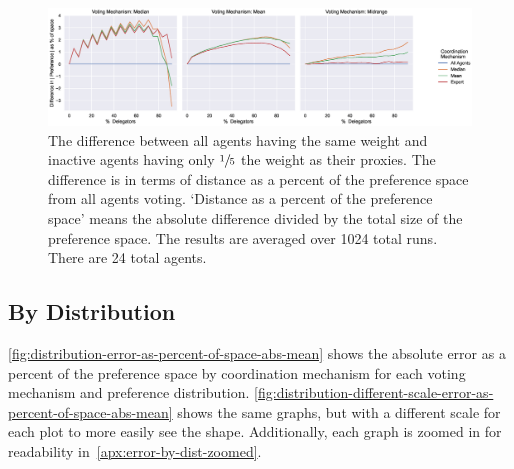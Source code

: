 \begin{landscape}
    \begin{figure}[p]
        \centering
        \includegraphics[scale=0.55]
        {content/chapter2/figures/different_weight/difference_abs_pref_percent_of_space}
        \caption{
            The difference between all agents having the same weight and inactive
            agents having only $\sfrac{1}{5}$ the weight as their proxies.
            The difference is in terms of distance as a percent of the preference
            space from all agents voting.
            `Distance as a percent of the preference space' means the absolute
            difference divided by the total size of the preference space.
            The results are averaged over 1024 total runs.
            There are 24 total agents.
        }
        \label{fig:different-weight-comparison}
    \end{figure}
\end{landscape}

\subsection{By Distribution}\label{subsec:results-distribution}
\autoref{fig:distribution-error-as-percent-of-space-abs-mean} shows
the absolute error as a percent of the preference space by coordination mechanism for
each voting mechanism and preference distribution.
\autoref{fig:distribution-different-scale-error-as-percent-of-space-abs-mean} shows
the same graphs, but with a different scale for each plot to more easily see the shape.
Additionally, each graph is zoomed in for readability
in~\autoref{apx:error-by-dist-zoomed}.


